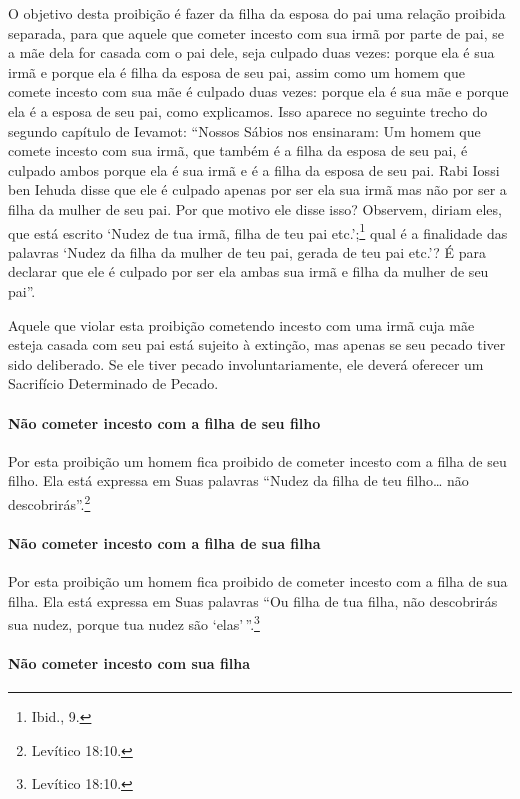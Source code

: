 \begin{multicols}{2}
O objetivo desta proibição é fazer da filha da esposa do pai uma relação
proibida separada, para que aquele que cometer incesto com sua irmã por
parte de pai, se a mãe dela for casada com o pai dele, seja culpado duas
vezes: porque ela é sua irmã e porque ela é filha da esposa de seu pai,
assim como um homem que comete incesto com sua mãe é culpado duas vezes:
porque ela é sua mãe e porque ela é a esposa de seu pai, como
explicamos. Isso aparece no seguinte trecho do segundo capítulo de
Ievamot\starr: ``Nossos Sábios nos ensinaram: Um homem que comete incesto com
sua irmã, que também é a filha da esposa de seu pai, é culpado ambos
porque ela é sua irmã e é a filha da esposa de seu pai. Rabi Iossi ben
Iehuda\starr{} disse que ele é culpado apenas por ser ela sua irmã mas não por
ser a filha da mulher de seu pai. Por que motivo ele disse isso?
Observem, diriam eles, que está escrito `Nudez de tua irmã, filha de teu
pai etc.';\footnote{Ibid., 9.} qual é a finalidade das palavras `Nudez da filha
da mulher de teu pai, gerada de teu pai etc.'? É para declarar que ele
é culpado por ser ela ambas sua irmã e filha da mulher de seu pai''.

Aquele que violar esta proibição cometendo incesto com uma irmã cuja mãe
esteja casada com seu pai está sujeito à extinção, mas apenas se seu
pecado tiver sido deliberado. Se ele tiver pecado involuntariamente, ele
deverá oferecer um Sacrifício Determinado de Pecado.

\paragraph{Não cometer incesto com a filha de seu filho}

Por esta proibição um homem fica proibido de cometer incesto com a filha
de seu filho. Ela está expressa em Suas palavras ``Nudez da filha de teu
filho\ldots{} não descobrirás''.\footnote{Levítico 18:10.}

\paragraph{Não cometer incesto com a filha de sua filha}

Por esta proibição um homem fica proibido de cometer incesto com a filha
de sua filha. Ela está expressa em Suas palavras ``Ou filha de tua
filha, não descobrirás sua nudez, porque tua nudez são `elas'\,''.\footnote{Levítico 18:10.}

\paragraph{Não cometer incesto com sua filha}


\end{multicols}
